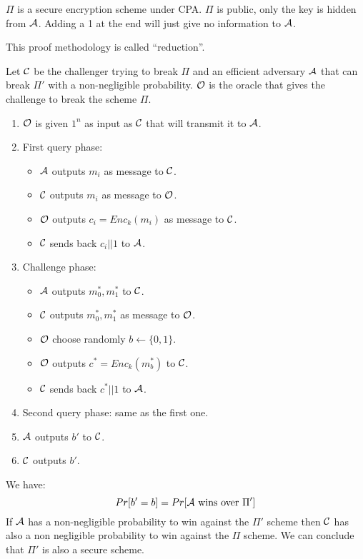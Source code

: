 \begin{solution}
  $\Pi$ is a secure encryption scheme under CPA. $\Pi$ is public, only the key is hidden from $\mathcal{A}$. Adding a 1 at the end will just give no information to $\mathcal{A}$.

  This proof methodology is called ``reduction''.
  
  Let $\mathcal{C}$ be the challenger trying to break $\Pi$ and an efficient adversary $\mathcal{A}$ that can break $\Pi'$ with a non-negligible probability. $\mathcal{O}$ is the oracle that gives the challenge to break the scheme $\Pi$.
  \begin{enumerate}
    \item $\mathcal{O}$ is given $1^n$ as input as $\mathcal{C}$ that will transmit it to $\mathcal{A}$.
    \item First query phase:
      \begin{itemize}
        \item $\mathcal{A}$ outputs $m_i$ as message to $\mathcal{C}$.
        \item $\mathcal{C}$ outputs $m_i$ as message to $\mathcal{O}$.
        \item $\mathcal{O}$ outputs $c_i = Enc_k(m_i)$ as message to $\mathcal{C}$.
        \item $\mathcal{C}$ sends back $c_i||1$ to $\mathcal{A}$.
      \end{itemize}
    \item Challenge phase:
      \begin{itemize}
        \item $\mathcal{A}$ outputs $m_0^\ast, m_1^\ast$ to $\mathcal{C}$.
        \item $\mathcal{C}$ outputs $m_0^\ast, m_1^\ast$ as message to $\mathcal{O}$.
        \item $\mathcal{O}$ choose randomly $b \leftarrow \{0,1\}$.
        \item $\mathcal{O}$ outputs $c^\ast = Enc_k(m_b^\ast)$ to $\mathcal{C}$.
        \item $\mathcal{C}$ sends back $c^\ast||1$ to $\mathcal{A}$.
      \end{itemize}
    \item Second query phase: same as the first one.
    \item $\mathcal{A}$ outputs $b'$ to $\mathcal{C}$.
    \item $\mathcal{C}$ outputs $b'$.
  \end{enumerate}
  We have:
  $$Pr[b'=b] = Pr[\mathcal{A} \text{ wins over } \Pi']$$
  If $\mathcal{A}$ has a non-negligible probability to win against the $\Pi'$ scheme then $\mathcal{C}$ has also a non negligible probability to win against the $\Pi$ scheme. We can conclude that $\Pi'$ is also a secure scheme.
\end{solution}

